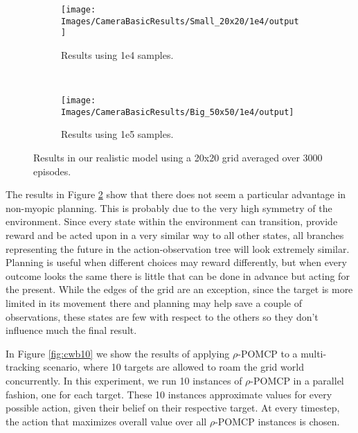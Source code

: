\begin{figure}[ht!]
        \centering
        \begin{subfigure}[t]{0.45\textwidth}
                \texttt{[image: Images/CameraBasicResults/Small\_20x20/1e4/output]}
                \caption{Results using 1e4 samples.}
                \label{fig:cws4mb}
        \end{subfigure}%
        ~ %
        \begin{subfigure}[t]{0.45\textwidth}
                \texttt{[image: Images/CameraBasicResults/Big\_50x50/1e4/output]}
                \caption{Results using 1e5 samples.}
                \label{fig:cws5mb}
        \end{subfigure}
        \caption{Results in our realistic model using a 20x20 grid averaged over 3000 episodes.}\label{fig:cwsmb}
\end{figure}

The results in Figure \ref{fig:cws5mb} show that there does not seem a particular advantage in
non-myopic planning. This is probably due to the very high symmetry of the environment. 
Since every state within the environment can transition, provide reward and be acted upon in a very similar way to all other states, all branches representing the future in the action-observation tree will look extremely similar. Planning is useful when different choices may reward differently, but when every outcome looks the same there is little that can be done in advance but acting for the present. While the edges of the grid are an exception, since the target is more limited in its movement there and planning may help save a couple of observations, these states are few with respect to the others so they don't influence much the final result.

In Figure \ref{fig:cwb10} we show the results of applying $\rho$-POMCP to a multi-tracking scenario, where
10 targets are allowed to roam the grid world concurrently. In this experiment, we run 10 instances
of $\rho$-POMCP in a parallel fashion, one for each target. These 10 instances approximate values for
every possible action, given their belief on their respective target. At every timestep, the action that
maximizes overall value over all $\rho$-POMCP instances is chosen.

